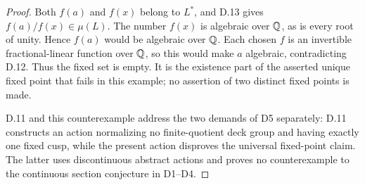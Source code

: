 \begin{proof}
Both $f(a)$ and $f(x)$ belong to $L^*$, and D.13 gives
$f(a)/f(x)\in\mu(L)$. The number $f(x)$ is algebraic
over $\mathbb Q$, as is every root of unity. Hence $f(a)$
would be algebraic over $\mathbb Q$. Each chosen $f$ is an
invertible fractional-linear function over $\mathbb Q$, so
this would make $a$ algebraic, contradicting D.12.
Thus the fixed set is empty.
It is the existence part of the asserted unique fixed point
that fails in this example; no assertion of two distinct
fixed points is made.

D.11 and this counterexample address the two demands
of D5 separately: D.11 constructs an action normalizing
no finite-quotient deck group and having exactly one fixed
cusp, while the present action disproves the universal
fixed-point claim. The latter uses discontinuous abstract
actions and proves no counterexample to the continuous
section conjecture in D1--D4.
\end{proof}
